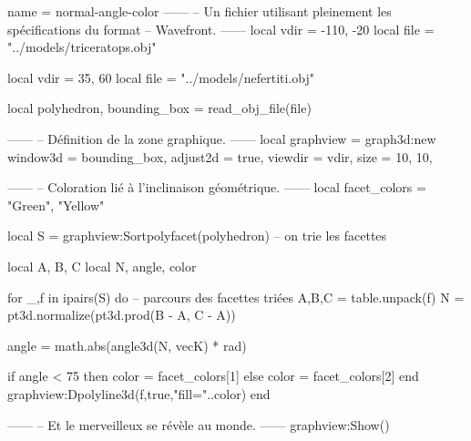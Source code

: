 \documentclass{standalone}
\begin{document}
\begin{luadraw}{name = normal-angle-color}
------
-- Un fichier utilisant pleinement les spécifications du format
-- Wavefront.
------
local vdir = {-110, -20}
local file = "../models/triceratops.obj"

local vdir = {35, 60}
local file = "../models/nefertiti.obj"

local polyhedron, bounding_box = read_obj_file(file)

------
-- Définition de la zone graphique.
------
local graphview = graph3d:new{
  window3d = bounding_box,
  adjust2d = true,
  viewdir  = vdir,
  size     = {10, 10},
}

------
-- Coloration lié à l'inclinaison géométrique.
------
local facet_colors = {"Green", "Yellow"}

local S = graphview:Sortpolyfacet(polyhedron) -- on trie les facettes

local A, B, C
local N, angle, color

for _,f in ipairs(S) do  -- parcours des facettes triées
  A,B,C = table.unpack(f)
  N = pt3d.normalize(pt3d.prod(B - A, C - A))

  angle = math.abs(angle3d(N, vecK) * rad)


  if angle < 75 then
    color = facet_colors[1]
  else
    color = facet_colors[2]
  end
  graphview:Dpolyline3d(f,true,"fill="..color)
end

------
-- Et le merveilleux se révèle au monde.
------
graphview:Show()

\end{luadraw}
\end{document}
